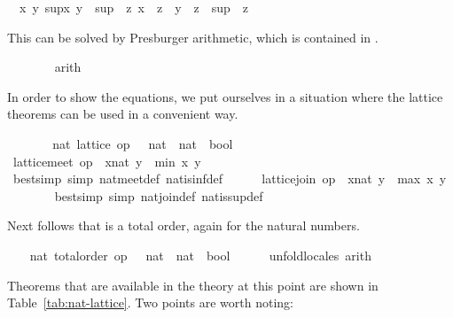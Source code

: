 \begin{isabellebody}
\begin{isamarkuptxt}
\begin{isabelle}
\ {}{\isachardot}\ {\isasymAnd}x\ y{\isachardot}\ {\isasymexists}sup{\isasymge}x{\isachardot}\ y\ {\isasymle}\ sup\ {\isasymand}\ {\isacharparenleft}{\isasymforall}z{\isachardot}\ x\ {\isasymle}\ z\ {\isasymand}\ y\ {\isasymle}\ z\ {\isasymlongrightarrow}\ sup\ {\isasymle}\ z{\isacharparenright}%
\end{isabelle}
	This can be solved by Presburger arithmetic, which is contained
	in .%
\end{isamarkuptxt}%
\isamarkuptrue%
\ \ \ \ \ \ \isamarkupfalse%
\ arith{\isacharplus}%
\begin{isamarkuptxt}%
\normalsize In order to show the equations, we put ourselves
      in a situation where the lattice theorems can be used in a
      convenient way.%
\end{isamarkuptxt}%
\isamarkuptrue%
\ \ \ \ \isamarkupfalse%
\ \isamarkupfalse%
\ nat{\isacharcolon}\ lattice\ {\isachardoublequoteopen}op\ {\isasymle}\ {\isacharcolon}{\isacharcolon}\ nat\ {\isasymRightarrow}\ nat\ {\isasymRightarrow}\ bool{\isachardoublequoteclose}\ \isacommand{{\isachardot}}\isamarkupfalse%
\isanewline
\ \ \ \ \isamarkupfalse%
\ {\isachardoublequoteopen}lattice{\isachardot}meet\ op\ {\isasymle}\ {\isacharparenleft}x{\isacharcolon}{\isacharcolon}nat{\isacharparenright}\ y\ {\isacharequal}\ min\ x\ y{\isachardoublequoteclose}\isanewline
\ \ \ \ \ \ \isamarkupfalse%
\ {\isacharparenleft}bestsimp\ simp{\isacharcolon}\ nat{\isachardot}meet{\isacharunderscore}def\ nat{\isachardot}is{\isacharunderscore}inf{\isacharunderscore}def{\isacharparenright}\isanewline
\ \ \ \ \isamarkupfalse%
\ {\isachardoublequoteopen}lattice{\isachardot}join\ op\ {\isasymle}\ {\isacharparenleft}x{\isacharcolon}{\isacharcolon}nat{\isacharparenright}\ y\ {\isacharequal}\ max\ x\ y{\isachardoublequoteclose}\isanewline
\ \ \ \ \ \ \isamarkupfalse%
\ {\isacharparenleft}bestsimp\ simp{\isacharcolon}\ nat{\isachardot}join{\isacharunderscore}def\ nat{\isachardot}is{\isacharunderscore}sup{\isacharunderscore}def{\isacharparenright}\isanewline
\ \ \isamarkupfalse%
%
\endisatagvisible
{\isafoldvisible}%
%
\isadelimvisible
%
\endisadelimvisible
%
\begin{isamarkuptext}%
Next follows that  is a total order, again for
  the natural numbers.%
\end{isamarkuptext}%
\isamarkuptrue%
%
\isadelimvisible
\ \ %
\endisadelimvisible
%
\isatagvisible
{}\isamarkupfalse%
\ nat{\isacharcolon}\ total{\isacharunderscore}order\ {\isachardoublequoteopen}op\ {\isasymle}\ {\isacharcolon}{\isacharcolon}\ nat\ {\isasymRightarrow}\ nat\ {\isasymRightarrow}\ bool{\isachardoublequoteclose}\isanewline
\ \ \ \ \isamarkupfalse%
\ unfold{\isacharunderscore}locales\ arith%
\endisatagvisible
{\isafoldvisible}%
%
\isadelimvisible
%
\endisadelimvisible
%
\begin{isamarkuptext}%
Theorems that are available in the theory at this point are shown in
  Table~\ref{tab:nat-lattice}.  Two points are worth noting:


\end{isamarkuptext}
\end{isabellebody}
